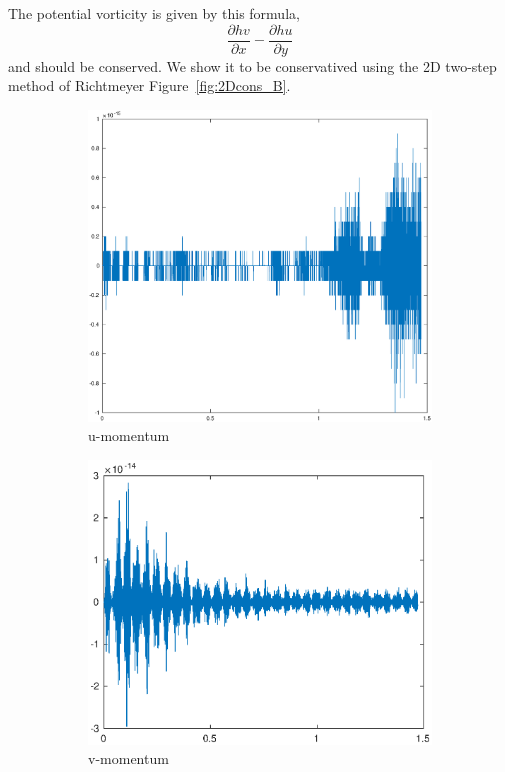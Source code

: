 The potential vorticity is given by this formula,
\begin{equation}\label{eqn:13}
\frac{\partial hv}{\partial x} - \frac{\partial hu}{\partial y} 
\end{equation}
and should be conserved. We show it to be conservatived using the 2D two-step method
of Richtmeyer Figure~\ref{fig:2Dcons_B}.
\newline

\begin{figure}[h!]
    \centering
    \begin{subfigure}[b]{0.9\textwidth}
        \centering
        \includegraphics[width=1.1\textwidth,height=0.52\textwidth]{images/cons_momu.eps}\hfill
        \caption{u-momentum}
        \label{fig:Energy}
    \end{subfigure}
    \hfill
    \begin{subfigure}[b]{0.9\textwidth}
        \centering
        \includegraphics[width=1.1\textwidth, height=0.52\textwidth]{images/cons_momv.eps}\hfill
        \caption{v-momentum}
        \label{fig:Mass}
    \end{subfigure}
    \hfill
    \begin{subfigure}[b]{0.9\textwidth}
        \centering

\end{subfigure}
\end{figure}
